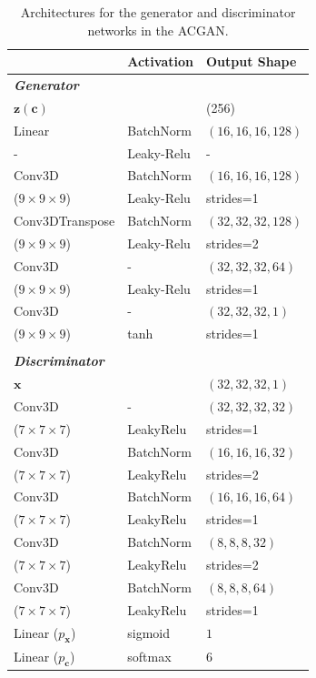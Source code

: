 \documentclass[twocolumn]{article}
\numberwithin{equation}{section}
\begin{document}
\begin{table}[h!]
\centering
\begin{tabularx}{\columnwidth}{@{}YYY@{}}%
 \hline
 & \textbf{Activation} & \textbf{Output Shape}  \\ %
 \hline\hline
 \bf{\textit{Generator}} & & \\
 \hline\hline
$\mathbf{z}(\mathbf{c})$ & &  (256) \\
 \hline
Linear & BatchNorm  & $(16, 16, 16, 128)$ \\ 
    - &  Leaky-Relu & - \\ 
 \hline
 Conv3D & BatchNorm  & $(16, 16, 16, 128)$ \\ 
     ($9\times9\times9$)&  Leaky-Relu  & strides=1 \\
 \hline
Conv3DTranspose & BatchNorm  & $(32, 32, 32, 128)$ \\ 
    ($9\times9\times9$)&  Leaky-Relu & strides=2 \\
 \hline
Conv3D  & - & $(32, 32, 32, 64)$ \\ 
 ($9\times9\times9$)& Leaky-Relu & strides=1 \\ [1ex] 
 \hline\hline
Conv3D  & - & $(32, 32, 32, 1)$ \\ 
 ($9\times9\times9$)& tanh & strides=1 \\ [1ex] 
 
 \hline
 \\
 \hline
 
 \bf{\textit{Discriminator}} & &  \\
 \hline
 $\mathbf{x}$ & &  $(32, 32, 32, 1)$ \\
 \hline
 Conv3D & - & $(32, 32, 32, 32)$ \\
  ($7\times7\times7$)&   LeakyRelu &  strides=1 \\
 \hline
  Conv3D & BatchNorm & $(16, 16, 16, 32)$ \\
  ($7\times7\times7$) &   LeakyRelu &  strides=2 \\
 \hline
 Conv3D & BatchNorm & $(16, 16, 16, 64)$ \\ 
 ($7\times7\times7$) &  LeakyRelu   & strides=1 \\
 \hline
  Conv3D & BatchNorm & $(8, 8, 8, 32)$ \\
  ($7\times7\times7$) &   LeakyRelu &  strides=2 \\
 \hline
 Conv3D & BatchNorm &  $(8, 8, 8, 64)$ \\ 
 ($7\times7\times7$) &  LeakyRelu & strides=1 \\
 \hline
 Linear ($p_\mathbf{x}$) & sigmoid & $ 1 $ \\ [1ex] 
 Linear ($p_\mathbf{c}$) & softmax & $ 6 $ \\ [1ex] 
 \hline
\end{tabularx}
\caption{Architectures for the generator and discriminator networks in the ACGAN.}
\label{table:acgan_archi}
\end{table}
\end{document}
